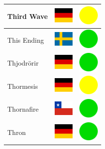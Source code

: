 \documentclass[12pt, a4paper, twoside]{report}
\begin{document}
\begin{center}
\begin{longtable}{|p{5cm}|p{2cm}|p{2cm}|}
 Third Wave                                                 & \includegraphics[width=1cm]{../img/flags/de} &   \includegraphics[width=1cm]{../likes/m} \\ \hline
 This Ending                                                & \includegraphics[width=1cm]{../img/flags/se} &   \includegraphics[width=1cm]{../likes/y} \\ \hline
 Thjodrörir                                                 & \includegraphics[width=1cm]{../img/flags/de} &   \includegraphics[width=1cm]{../likes/y} \\ \hline
 Thormesis                                                  & \includegraphics[width=1cm]{../img/flags/de} &   \includegraphics[width=1cm]{../likes/m} \\ \hline
 Thornafire                                                 & \includegraphics[width=1cm]{../img/flags/cl} &   \includegraphics[width=1cm]{../likes/y} \\ \hline
 Thron                                                      & \includegraphics[width=1cm]{../img/flags/de} &   \includegraphics[width=1cm]{../likes/y} \\ \hline

\end{longtable}
\end{center}
\end{document}
